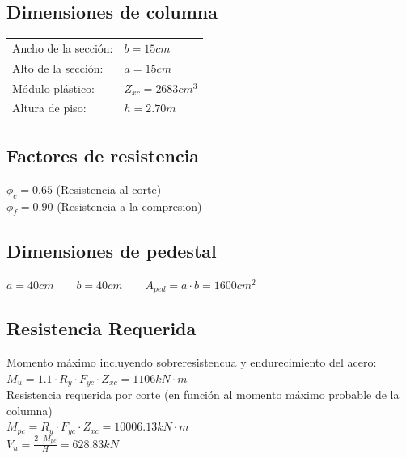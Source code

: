 \documentclass[12pt]{article}
\begin{document}
        \subsection{Dimensiones de columna}
        \begin{tabular}{ll}
            Ancho de la sección:& $b = 15 cm$ \hspace{15cm} \\
            Alto de la sección:& $a = 15 cm$ \\
            Módulo plástico:& $Z_{xc} = 2683 cm^3 $ \\
            Altura de piso:& $h=2.70m$
        \end{tabular}
    
        \subsection{Factores de resistencia}
        \noindent$\phi_{c} = 0.65$ (Resistencia al corte) \\
        $\phi_{f} = 0.90$ (Resistencia a la compresion)\\
        
        \subsection{Dimensiones de pedestal}
        $a = 40 cm \qquad b = 40 cm \qquad A_{ped} = a \cdot b = 1600 cm^{2} $   \\

        \subsection{Resistencia Requerida}
        \noindent Momento máximo incluyendo sobreresistencua y endurecimiento del acero: \\
        $M_{u} = 1.1 \cdot R_y \cdot F_{yc} \cdot Z_{xc} = 1106 kN \cdot m $ \\
        Resistencia requerida por corte (en función al momento máximo probable de la columna)\\
        $M_{pc} = R_{y} \cdot F_{yc} \cdot Z_{xc} = 10006.13 kN \cdot m $ \\
        $ V_{u} = \frac{2 \cdot M_{pc}}{H} = 628.83 kN \hspace{15cm} $
\end{document}
